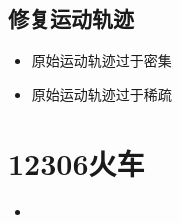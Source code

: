 \subsection{修复运动轨迹}
\begin{itemize}
	\item 原始运动轨迹过于密集
	\item 原始运动轨迹过于稀疏
	
\end{itemize}



\section{12306火车}
\begin{itemize}
	\item 
	
\end{itemize}

